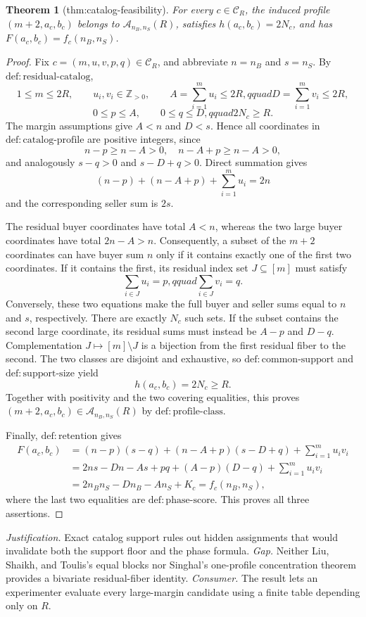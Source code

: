 \documentclass{article}
\newtheorem{theorem}{Theorem}
\begin{document}
\begin{theorem}[thm:catalog-feasibility]\label{thm:catalog-feasibility}
For every \(c\in\mathcal C_R\), the induced profile \((m+2,a_c,b_c)\) belongs to \(\mathcal A_{n_B,n_S}(R)\), satisfies \(h(a_c,b_c)=2N_c\), and has \(F(a_c,b_c)=f_c(n_B,n_S)\).
\end{theorem}
\begin{proof}
Fix \(c=(m,u,v,p,q)\in\mathcal C_R\), and abbreviate \(n=n_B\) and \(s=n_S\).  By \(\mathrm{def{:}residual\text{-}catalog}\),
\[
 1\le m\le2R,\qquad u_i,v_i\in\mathbb Z_{>0},\qquad
 A=\sum_{i=1}^m u_i\le2R,qquad D=\sum_{i=1}^m v_i\le2R,
\]
\[
 0\le p\le A,\qquad 0\le q\le D,qquad 2N_c\ge R.
\]
The margin assumptions give \(A<n\) and \(D<s\).  Hence all coordinates in \(\mathrm{def{:}catalog\text{-}profile}\) are positive integers, since
\[
 n-p\ge n-A>0,\quad n-A+p\ge n-A>0,
\]
and analogously \(s-q>0\) and \(s-D+q>0\).  Direct summation gives
\[
 (n-p)+(n-A+p)+\sum_{i=1}^m u_i=2n
\]
and the corresponding seller sum is \(2s\).

The residual buyer coordinates have total \(A<n\), whereas the two large buyer coordinates have total \(2n-A>n\).  Consequently, a subset of the \(m+2\) coordinates can have buyer sum \(n\) only if it contains exactly one of the first two coordinates.  If it contains the first, its residual index set \(J\subseteq[m]\) must satisfy
\[
 \sum_{i\in J}u_i=p,qquad \sum_{i\in J}v_i=q.
\]
Conversely, these two equations make the full buyer and seller sums equal to \(n\) and \(s\), respectively.  There are exactly \(N_c\) such sets.  If the subset contains the second large coordinate, its residual sums must instead be \(A-p\) and \(D-q\).  Complementation \(J\mapsto[m]\setminus J\) is a bijection from the first residual fiber to the second.  The two classes are disjoint and exhaustive, so \(\mathrm{def{:}common\text{-}support}\) and \(\mathrm{def{:}support\text{-}size}\) yield
\[
 h(a_c,b_c)=2N_c\ge R.
\]
Together with positivity and the two covering equalities, this proves \((m+2,a_c,b_c)\in\mathcal A_{n_B,n_S}(R)\) by \(\mathrm{def{:}profile\text{-}class}\).

Finally, \(\mathrm{def{:}retention}\) gives
\[
\begin{aligned}
 F(a_c,b_c)
 &= (n-p)(s-q)+(n-A+p)(s-D+q)+\sum_{i=1}^m u_iv_i\\
 &=2ns-Dn-As+pq+(A-p)(D-q)+\sum_{i=1}^m u_iv_i\\
 &=2n_Bn_S-Dn_B-An_S+K_c
 =f_c(n_B,n_S),
\end{aligned}
\]
where the last two equalities are \(\mathrm{def{:}phase\text{-}score}\).  This proves all three assertions.
\end{proof}
\par\smallskip\noindent \textit{Justification.} Exact catalog support rules out hidden assignments that would invalidate both the support floor and the phase formula. \textit{Gap.} Neither Liu, Shaikh, and Toulis's equal blocks nor Singhal's one-profile concentration theorem provides a bivariate residual-fiber identity. \textit{Consumer.} The result lets an experimenter evaluate every large-margin candidate using a finite table depending only on \(R\).
\end{document}
